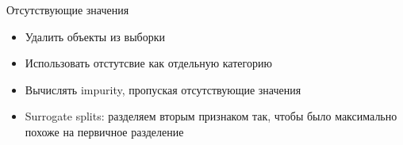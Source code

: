 \documentclass[10pt]{beamer}
\begin{document}

\begin{frame}{Отсутствующие значения}

\begin{itemize}
\item Удалить объекты из выборки
\item Использовать отстутсвие как отдельную категорию
\item Вычислять impurity, пропуская отсутствующие значения
\item Surrogate splits: разделяем вторым признаком так, чтобы было максимально похоже на первичное разделение
\end{itemize}

\end{frame}

\end{document}
